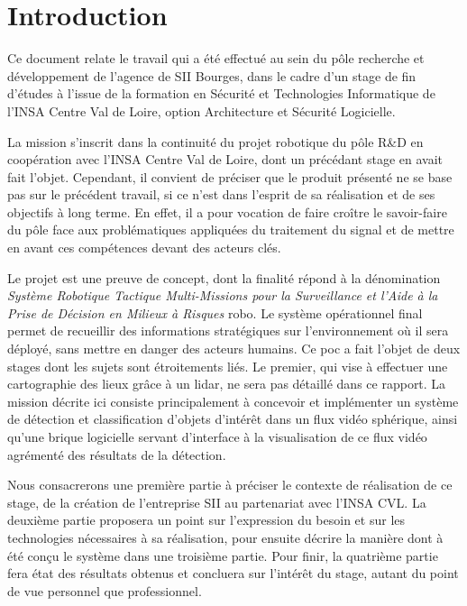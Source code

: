 \section*{Introduction}
{}
	
	Ce document relate le travail qui a été effectué au sein du pôle recherche et développement de l'agence de SII Bourges, dans le cadre d'un stage de fin d'études à l'issue de la formation en Sécurité et Technologies Informatique de l'INSA Centre Val de Loire, option Architecture et Sécurité Logicielle.
	
	La mission s'inscrit dans la continuité du projet robotique du pôle R\&D en coopération avec l'INSA Centre Val de Loire, dont un précédant stage en avait fait l'objet. Cependant, il convient de préciser que le produit présenté ne se base pas sur le précédent travail, si ce n'est dans l'esprit de sa réalisation et de ses objectifs à long terme. En effet, il a pour vocation de faire croître le savoir-faire du pôle face aux problématiques appliquées du traitement du signal et de mettre en avant ces compétences devant des acteurs clés.
	
	Le projet est une preuve de concept, dont la finalité répond à la dénomination \emph{Système Robotique Tactique Multi-Missions pour la Surveillance et l'Aide à la Prise de Décision en Milieux à Risques} \gls{robo}. Le système opérationnel final permet de recueillir des informations stratégiques sur l'environnement où il sera déployé, sans mettre en danger des acteurs humains. Ce \gls{poc} a fait l'objet de deux stages dont les sujets sont étroitements liés. Le premier, qui vise à effectuer une cartographie des lieux grâce à un \gls{lidar}, ne sera pas détaillé dans ce rapport. La mission décrite ici consiste principalement à concevoir et implémenter un système de détection et classification d'objets d'intérêt dans un flux vidéo sphérique, ainsi qu'une brique logicielle servant d'interface à la visualisation de ce flux vidéo agrémenté des résultats de la détection.
	
	Nous consacrerons une première partie à préciser le contexte de réalisation de ce stage, de la création de l'entreprise SII au partenariat avec l'INSA CVL. La deuxième partie proposera un point sur l'expression du besoin et sur les technologies nécessaires à sa réalisation, pour ensuite décrire la manière dont à été conçu le système dans une troisième partie. Pour finir, la quatrième partie fera état des résultats obtenus et concluera sur l'intérêt du stage, autant du point de vue personnel que professionnel.
